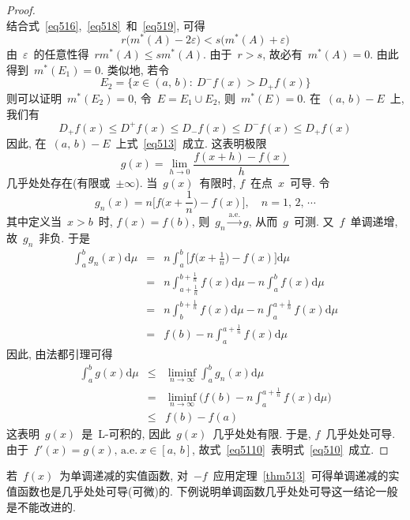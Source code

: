 \begin{proof}
\begin{equation}
\end{equation}
结合式~\eqref{eq516},~\eqref{eq518}~和~\eqref{eq519}, 可得
\[
r \big( m^*(A) -2\varepsilon \big) < s \big( m^*(A) + \varepsilon \big)
\]
由~$\varepsilon$~的任意性得~$r m^*(A) \leqslant s m^*(A)$. 由于~$r>s$, 故必有~$m^*(A) = 0$. 由此得到~$m^*(E_1)=0$. 类似地, 若令
\[
E_2 = \big\{x \in (a,\,b):\: D^-f(x) > D_+f(x)\big\}
\]
则可以证明~$m^*(E_2) = 0$, 令~$E = E_1 \cup E_2$, 则~$m^*(E) = 0$. 在~$(a,\,b) - E$~上, 我们有
\[
D_+f(x) \leqslant D^+f(x) \leqslant D_-f(x) \leqslant D^-f(x) \leqslant D_+f(x)
\]
因此, 在~$(a,\,b) - E$~上式~\eqref{eq513}~成立. 这表明极限
\[
g(x) = \lim_{h \to 0} \frac{f(x+h)-f(x)}{h}
\]
几乎处处存在(有限或~$\pm\infty$). 当~$g(x)$~有限时, $f$~在点~$x$~可导. 令
\[
g_n(x) = n \big[ f\big(x+ \frac{1}{n}\big) - f(x)\big], \quad n =1, \, 2,\,\cdots
\]
其中定义当~$x>b$~时, $f(x)=f(b)$, 则~$g_n \xrightarrow{\mathrm{a.e.}} g$, 从而~$g$~可测. 又~$f$~单调递增, 故~$g_n$~非负. 于是
\begin{eqnarray*}
\int_a^b g_n(x) \mathrm{d} \mu &=& n \int_a^b \big[f\big(x+ \frac{1}{n}\big) - f(x)\big] \mathrm{d} \mu \\
&=& n \int_{a+\frac{1}{n}}^{b+\frac{1}{n}} f(x) \mathrm{d} \mu - n \int_a^b f(x) \mathrm{d} \mu \\
&=& n \int_b^{b+\frac{1}{n}} f(x) \mathrm{d} \mu - n \int_a^{a+\frac{1}{n}} f(x) \mathrm{d} \mu \\
&=& f(b) - n \int_a^{a+\frac{1}{n}} f(x) \mathrm{d} \mu
\end{eqnarray*}
因此, 由法都引理可得
\begin{eqnarray} \label{eq5110}
\int_a^b g(x) \mathrm{d} \mu &\leqslant& \liminf_{n \to \infty} \int_a^b g_n(x) \mathrm{d} \mu \nonumber \\
&=& \liminf_{n \to \infty} \Big( f(b) - n \int_a^{a+\frac{1}{n}} f(x) \mathrm{d} \mu \Big) \\
&\leqslant& f(b) - f(a) \nonumber
\end{eqnarray}
这表明~$g(x)$~是~L-可积的, 因此~$g(x)$~几乎处处有限. 于是, $f$~几乎处处可导. 由于~$f'(x) = g(x), \, \mathrm{a.e.~} x \in [a,\,b]$, 故式~\eqref{eq5110}~表明式~\eqref{eq510}~成立.
\end{proof}

若~$f(x)$~为单调递减的实值函数, 对~$-f$~应用定理~\ref{thm513}~可得单调递减的实值函数也是几乎处处可导(可微)的. 下例说明单调函数几乎处处可导这一结论一般是不能改进的.

